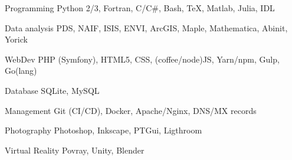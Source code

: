 
\begin{cvskills}

	\cvskill
	{Programming}
    {Python 2/3, Fortran, C/C\#, Bash, \TeX, Matlab, Julia, IDL}

	\cvskill
	{Data analysis}
    {PDS, NAIF, ISIS, ENVI, ArcGIS, Maple, Mathematica, Abinit, Yorick}

	\cvskill
    {WebDev}
    {PHP (Symfony), HTML5, CSS, (coffee/node)JS, Yarn/npm, Gulp, Go(lang)}

	\cvskill
    {Database}
    {SQLite, MySQL}

	\cvskill
    {Management}
    {Git (CI/CD), Docker, Apache/Nginx, DNS/MX records}

	\cvskill
    {Photography}
    {Photoshop, Inkscape, PTGui, Ligthroom}

    \cvskill
    {Virtual Reality}
    {Povray, Unity, Blender}

\end{cvskills}
